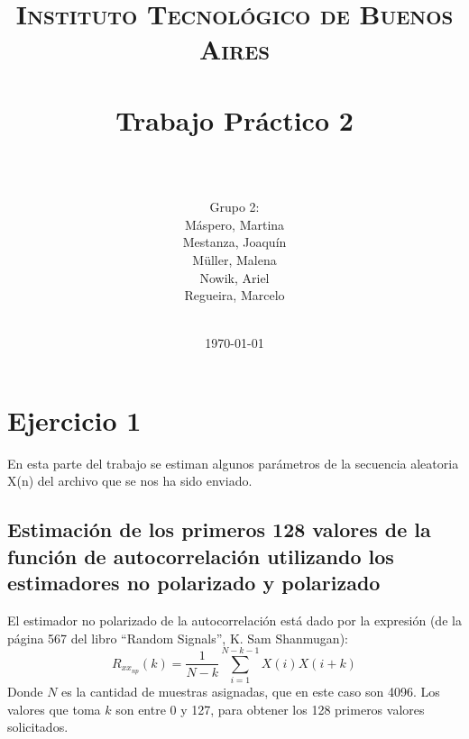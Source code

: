 
\usepackage[utf8]{inputenc}





\title{
	\normalfont \normalsize \textsc{Instituto Tecnológico de Buenos Aires} \\ [25pt]
	\horrule{2pt} \\[0.4cm]
	\huge Trabajo Pr\'actico 2\\
	\horrule{2pt} \\[0cm]
\author{Grupo 2:\\M\'aspero, Martina \\Mestanza, Joaqu\'in\\ Müller, Malena\\Nowik, Ariel\\Regueira, Marcelo\\ \\ }
}
\date{\today} 

\maketitle
\newpage

\section*{Ejercicio 1}

En esta parte del trabajo se estiman algunos par\'ametros de la secuencia aleatoria X(n) del archivo que se nos ha sido enviado.

\subsection{Estimaci\'on de los primeros 128 valores de la funci\'on de autocorrelaci\'on utilizando los estimadores no polarizado y polarizado}

El estimador no polarizado de la autocorrelación está dado por la expresión (de la página 567 del libro ``Random Signals'', K. Sam Shanmugan):
$$R_{xx_{np}}(k) = \frac{1}{N - k} \sum_{i=1}^{N-k-1}X(i)X(i+k)$$
Donde $N$ es la cantidad de muestras asignadas, que en este caso son 4096. Los valores que toma $k$ son entre 0 y 127, para obtener los 128 primeros valores solicitados.\par

